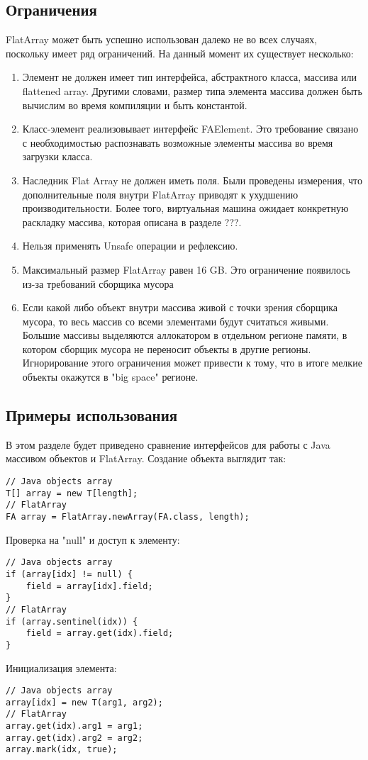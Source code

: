 \subsection{Ограничения}
FlatArray может быть успешно использован далеко не во всех случаях, поскольку имеет ряд ограничений. На данный момент их существует несколько:
\begin{enumerate}
	\item Элемент не должен имеет тип интерфейса, абстрактного класса, массива или flattened array. Другими словами, размер типа элемента массива должен быть вычислим во время компиляции и быть константой.
	\item Класс-элемент реализовывает интерфейс FAElement. Это требование связано с необходимостью распознавать возможные элементы массива во время загрузки класса.
	\item Наследник Flat Array не должен иметь поля. Были проведены измерения, что дополнительные поля внутри FlatArray приводят к ухудшению производительности. Более того, виртуальная машина ожидает конкретную раскладку массива, которая описана в разделе ???.
	\item Нельзя применять Unsafe операции и рефлексию.
	\item Максимальный размер FlatArray равен 16 GB. Это ограничение появилось из-за требований сборщика мусора
	\item Если какой либо объект внутри массива живой с точки зрения сборщика мусора, то весь массив со всеми элементами будут считаться живыми. Большие массивы выделяются аллокатором в отдельном регионе памяти, в котором сборщик мусора не переносит объекты в другие регионы. Игнорирование этого ограничения может привести к тому, что в итоге мелкие объекты окажутся в "big space" регионе.
\end{enumerate}

\subsection{Примеры использования}
В этом разделе будет приведено сравнение интерфейсов для работы с Java массивом объектов и FlatArray. Создание объекта выглядит так:
\begin{lstlisting}
// Java objects array
T[] array = new T[length];
// FlatArray
FA array = FlatArray.newArray(FA.class, length);
\end{lstlisting}
Проверка на "null" и доступ к элементу:
\begin{lstlisting}
// Java objects array
if (array[idx] != null) {
	field = array[idx].field;
}
// FlatArray
if (array.sentinel(idx)) {
	field = array.get(idx).field;
}
\end{lstlisting}
Инициализация элемента:
\begin{lstlisting}
// Java objects array
array[idx] = new T(arg1, arg2);
// FlatArray
array.get(idx).arg1 = arg1;
array.get(idx).arg2 = arg2;
array.mark(idx, true);
\end{lstlisting}

\clearpage
